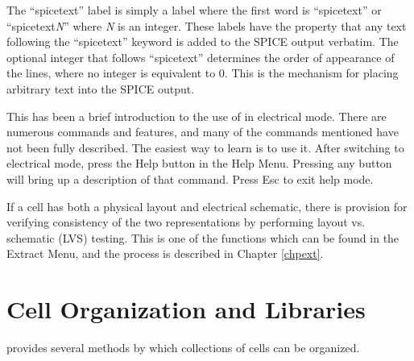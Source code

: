 The ``spicetext'' label is simply a label where the first word is
``spicetext'' or ``spicetext{\it N}'' where {\it N} is an integer. 
These labels have the property that any text following the
``spicetext'' keyword is added to the SPICE output verbatim.  The
optional integer that follows ``spicetext'' determines the order of
appearance of the lines, where no integer is equivalent to 0.  This is
the mechanism for placing arbitrary text into the SPICE output.

This has been a brief introduction to the use of {\Xic} in electrical
mode.  There are numerous commands and features, and many of the
commands mentioned have not been fully described.  The easiest way to
learn {\Xic} is to use it.  After switching to electrical mode, press
the {\cb Help} button in the {\cb Help Menu}.  Pressing any button
will bring up a description of that command.  Press {\kb Esc} to exit
help mode.

If a cell has both a physical layout and electrical schematic, there
is provision for verifying consistency of the two representations by
performing layout vs. schematic (LVS) testing.  This is one of the
functions which can be found in the {\cb Extract Menu}, and the process
is described in Chapter \ref{chpext}.


\section{Cell Organization and Libraries}
{\Xic} provides several methods by which collections of cells can be
organized.

